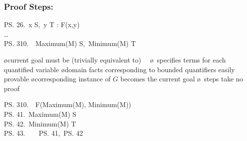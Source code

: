 \begin{frame}
  \frametitle{Proof Steps: \WITNESS}

  \qquad\begin{tlablock}
    \ps{2}{6.}\ \E x \in S,\ y \in T : F(x,y)\\
    \quad\ldots\\
    \quad\ps{3}{10.}\ \WITNESS\ Maximum(M) \in S,\ Minimum(M) \in T
  \end{tlablock}

  \begin{itemize}
  \oo {}

    \begin{itemize}
    \o current goal must be (trivially equivalent to)\ \ 
    \o \WITNESS\ specifies terms for each quantified variable
    \o domain facts corresponding to bounded quantifiers easily provable
    \o corresponding instance of $G$ becomes the current goal
    \o \WITNESS\ steps take no proof
    \end{itemize}

  \oo {}

    \medskip

    \begin{tlablock}
      \ps{3}{10.}\ \SUFFICES\ F(Maximum(M), Minimum(M))\\
      \quad\ps{4}{1.}\ Maximum(M) \in S\quad\OBVIOUS\\
      \quad\ps{4}{2.}\ Minimum(M) \in T\quad\OBVIOUS\\
      \quad\ps{4}{3.}\ \QED\ \BY\ \ONLY\ \ps{4}{1},\ \ps{4}{2}
    \end{tlablock}
  \end{itemize}
\end{frame}

